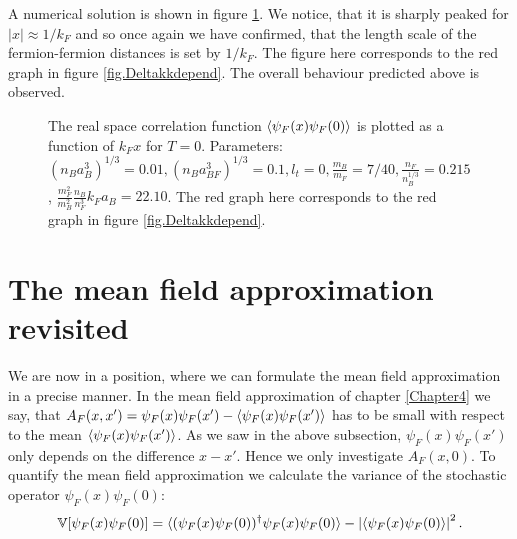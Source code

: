 A numerical solution is shown in figure \ref{fig.pairwavefunction}. We notice, that it is sharply peaked for $|x| \approx 1/k_F$ and so once again we have confirmed, that the length scale of the fermion-fermion distances is set by $1/k_F$. The figure here corresponds to the red graph in figure \ref{fig.Deltakkdepend}. The overall behaviour predicted above is observed. %

\begin{figure} 
\begin{center}  
  
\caption{The real space correlation function $\braket{\psi_F(x)\psi_F(0)}$ is plotted as a function of $k_Fx$ for $T = 0$. Parameters: $(n_Ba_B^3)^{1/3} = 0.01, (n_Ba_{BF}^3)^{1/3} = 0.1, l_t = 0, \frac{m_B}{m_F} = 7/40, \frac{n_F}{n_B^{1/3}} = 0.215$, $\frac{m_F^2}{m_B^2}\frac{n_B}{n_F^3} k_Fa_B = 22.10$. The red graph here corresponds to the red graph in figure \ref{fig.Deltakkdepend}.}  
\label{fig.pairwavefunction}  
\end{center}    
\end{figure}

\section{The mean field approximation revisited}
We are now in a position, where we can formulate the mean field approximation in a precise manner. In the mean field approximation of chapter \ref{Chapter4} we say, that $A_F(x,x') = \psi_F(x)\psi_F(x') - \braket{\psi_F(x)\psi_F(x')}$ has to be small with respect to the mean $\braket{\psi_F(x)\psi_F(x')}$. As we saw in the above subsection, $\psi_F(x)\psi_F(x')$ only depends on the difference $x-x'$. Hence we only investigate $A_F(x,0)$. 
To quantify the mean field approximation we calculate the variance of the stochastic operator $\psi_F(x)\psi_F(0)$:
\begin{equation}
\mathbb{V}[\psi_F(x)\psi_F(0)] = \braket{(\psi_F(x)\psi_F(0))^\dagger \psi_F(x)\psi_F(0)} - \left|\braket{\psi_F(x)\psi_F(0)}\right|^2. \nonumber  
\end{equation}

